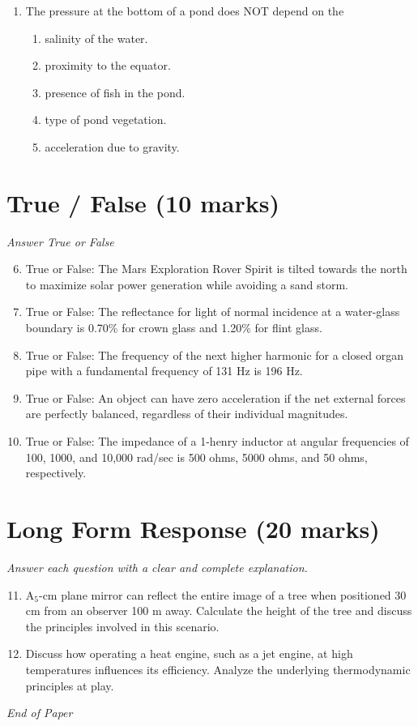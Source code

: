 \documentclass[12pt]{article}
\begin{document}
\begin{enumerate}[label=\arabic*.]
\begin{enumerate}[label=(\alph*)]
    \item 2.8 \ensuremath{\times} $10^10$ cm/sec
    \item 2.4 \ensuremath{\times} $10^10$ cm/sec
    \item 1.8 \ensuremath{\times} $10^10$ cm/sec
\end{enumerate}
\item The pressure at the bottom of a pond does NOT depend on the
\begin{enumerate}[label=(\alph*)]
    \item salinity of the water.
    \item proximity to the equator.
    \item presence of fish in the pond.
    \item type of pond vegetation.
    \item acceleration due to gravity.
\end{enumerate}
\end{enumerate}

\section*{True / False (10 marks)}
\textit{Answer True or False}
\begin{enumerate}[label=\arabic*.]
\setcounter{enumi}{5}
\item True or False: The Mars Exploration Rover Spirit is tilted towards the north to maximize solar power generation while avoiding a sand storm.
\item True or False: The reflectance for light of normal incidence at a water-glass boundary is 0.70\% for crown glass and 1.20\% for flint glass.
\item True or False: The frequency of the next higher harmonic for a closed organ pipe with a fundamental frequency of 131 Hz is 196 Hz.
\item True or False: An object can have zero acceleration if the net external forces are perfectly balanced, regardless of their individual magnitudes.
\item True or False: The impedance of a 1-henry inductor at angular frequencies of 100, 1000, and 10,000 rad/sec is 500 ohms, 5000 ohms, and 50 ohms, respectively.
\end{enumerate}

\section*{Long Form Response (20 marks)}
\textit{Answer each question with a clear and complete explanation.}
\begin{enumerate}[label=\arabic*.]
\setcounter{enumi}{10}
\item A$_{5}$-cm plane mirror can reflect the entire image of a tree when positioned 30 cm from an observer 100 m away. Calculate the height of the tree and discuss the principles involved in this scenario.
\item Discuss how operating a heat engine, such as a jet engine, at high temperatures influences its efficiency. Analyze the underlying thermodynamic principles at play.
\end{enumerate}

\vfill
\noindent\textit{End of Paper}
\end{document}
